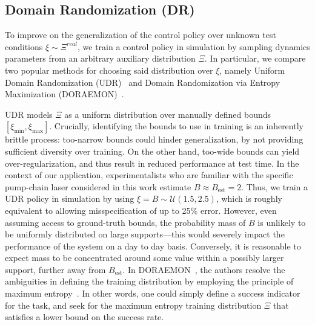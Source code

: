 
\subsection{Domain Randomization (DR)}
To improve on the generalization of the control policy over unknown test conditions $\xi \sim \Xi^{real} $, we train a control policy in simulation by sampling dynamics parameters from an arbitrary auxiliary distribution $\Xi$. In particular, we compare two popular methods for choosing said distribution over $\xi$, namely Uniform Domain Randomization (UDR)~\citep{tobin2017domain, sadeghi2016cad2rl} and Domain Randomization via Entropy Maximization (DORAEMON)~\citep{tiboni2023domain}.

UDR models \( \Xi \) as a uniform distribution over manually defined bounds \( [\xi_{\min}, \xi_{\max}] \).
Crucially, identifying the bounds to use in training is an inherently brittle process: too-narrow bounds could hinder generalization, by not providing sufficient diversity over training. On the other hand, too-wide bounds can yield over-regularization, and thus result in reduced performance at test time. In the context of our application, experimentalists who are familiar with the specific pump-chain laser considered in this work estimate \( B \approx B_{\text{est}} = 2 \). Thus, we train a UDR policy in simulation by using $\xi = B \sim \mathcal U(1.5, 2.5)$, which is roughly equivalent to allowing misspecification of up to 25\% error.
However, even assuming access to ground-truth bounds, the probability mass of \( B \) is unlikely to be uniformly distributed on large supports---this would severely impact the performance of the system on a day to day basis. Conversely, it is reasonable to expect mass to be concentrated around some value within a possibly larger support, further away from \( B_{\text{est}} \).
In DORAEMON~\citep{tiboni2023domain}, the authors resolve the ambiguities in defining the training distribution by employing the principle of maximum entropy~\citep{jaynes1957information}. In other words, one could simply define a success indicator for the task, and seek for the maximum entropy training distribution \( \Xi \) that satisfies a lower bound on the success rate.

